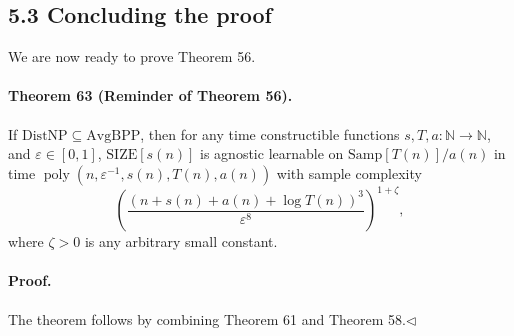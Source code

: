 \subsection*{5.3 Concluding the proof}
We are now ready to prove Theorem 56.
\paragraph{Theorem 63 (Reminder of Theorem 56).} If $\mathrm{DistNP}\subseteq\mathrm{AvgBPP}$, then for any time constructible functions $s,T,a:\mathbb N\to\mathbb N$, and $\varepsilon\in[0,1]$, $\mathrm{SIZE}[s(n)]$ is agnostic learnable on $\mathrm{Samp}[T(n)]/a(n)$ in time $\operatorname{poly}(n,\varepsilon^{-1},s(n),T(n),a(n))$ with sample complexity
\[\left(\frac{(n+s(n)+a(n)+\log T(n))^3}{\varepsilon^8}\right)^{1+\zeta},\]
where $\zeta>0$ is any arbitrary small constant.
\paragraph{Proof.} The theorem follows by combining Theorem 61 and Theorem 58.\hfill$\triangleleft$
